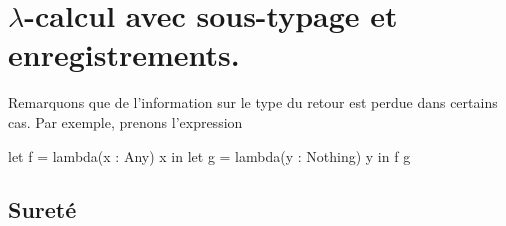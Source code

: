 \chapter{$\lambda$-calcul avec sous-typage et enregistrements.}

Remarquons que de l'information sur le type du retour est perdue dans certains
cas. Par exemple, prenons l'expression

let f = lambda(x : Any) x in
let g = lambda(y : Nothing) y in
f g


\section{Sureté}

